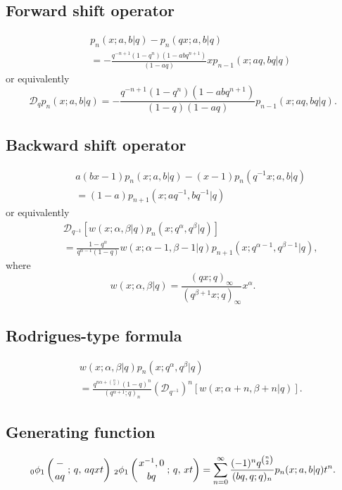 \documentclass[envcountchap,graybox]{svmono}
\newcommand{\qhyp}[5]{\mbox{}_{#1}{\phi}_{#2}
\left(\genfrac{}{}{0pt}{}{#3}{#4}\,;\,q,\,#5\right)}
\newcommand{\qhyp}[5]{\,\mbox{}_{#1}\phi_{#2}\!\left(
  \genfrac{}{}{0pt}{}{#3}{#4};#5\right)}
\begin{document}
\subsection*{Forward shift operator}
\begin{eqnarray}
\label{shift1LittleqJacobiI}
& &p_n(x;a,b|q)-p_n(qx;a,b|q)\nonumber\\
& &{}=-\frac{q^{-n+1}(1-q^n)(1-abq^{n+1})}{(1-aq)}xp_{n-1}(x;aq,bq|q)
\end{eqnarray}
or equivalently
\begin{equation}
\label{shift1LittleqJacobiII}
\mathcal{D}_qp_n(x;a,b|q)=-\frac{q^{-n+1}(1-q^n)(1-abq^{n+1})}
{(1-q)(1-aq)}p_{n-1}(x;aq,bq|q).
\end{equation}

\subsection*{Backward shift operator}
\begin{eqnarray}
\label{shift2LittleqJacobiI}
& &a(bx-1)p_n(x;a,b|q)-(x-1)p_n(q^{-1}x;a,b|q)\nonumber\\
& &{}=(1-a)p_{n+1}(x;aq^{-1},bq^{-1}|q)
\end{eqnarray}
or equivalently
\begin{eqnarray}
\label{shift2LittleqJacobiII}
& &\mathcal{D}_{q^{-1}}\left[w(x;\alpha,\beta|q)p_n(x;q^{\alpha},q^{\beta}|q)\right]\nonumber\\
& &{}=\frac{1-q^{\alpha}}{q^{\alpha-1}(1-q)}w(x;\alpha-1,\beta-1|q)p_{n+1}(x;q^{\alpha-1},q^{\beta-1}|q),
\end{eqnarray}
where
$$w(x;\alpha,\beta|q)=\frac{(qx;q)_{\infty}}{(q^{\beta+1}x;q)_{\infty}}x^{\alpha}.$$

\subsection*{Rodrigues-type formula}
\begin{eqnarray}
\label{RodLittleqJacobi}
& &w(x;\alpha,\beta|q)p_n(x;q^{\alpha},q^{\beta}|q)\nonumber\\
& &{}=\frac{q^{n\alpha+\binom{n}{2}}(1-q)^n}{(q^{\alpha+1};q)_n}
\left(\mathcal{D}_{q^{-1}}\right)^n\left[w(x;\alpha+n,\beta+n|q)\right].
\end{eqnarray}

\subsection*{Generating function}
\begin{equation}
\label{GenLittleqJacobi}
\qhyp{0}{1}{-}{aq}{aqxt}\,\qhyp{2}{1}{x^{-1},0}{bq}{xt}=\sum_{n=0}^{\infty}
\frac{(-1)^nq^{\binom{n}{2}}}{(bq,q;q)_n}p_n(x;a,b|q)t^n.
\end{equation}
\end{document}
